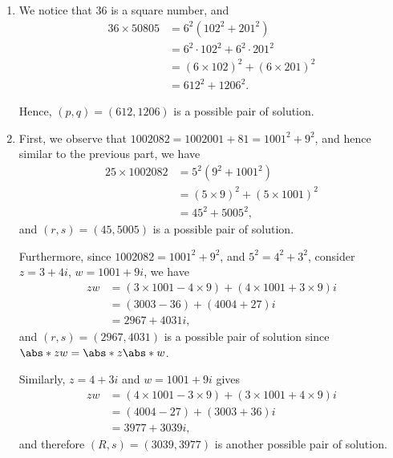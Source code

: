 \begin{enumerate}
    \item We notice that \(36\) is a square number, and
          \begin{align*}
              36 \times 50805 & = 6^2 \left(102^2 + 201^2\right)      \\
                              & = 6^2 \cdot 102^2 + 6^2 \cdot 201^2   \\
                              & = (6 \times 102)^2 + (6 \times 201)^2 \\
                              & = 612^2 + 1206^2.
          \end{align*}

          Hence, \((p, q) = (612, 1206)\) is a possible pair of solution.

    \item First, we observe that \(1002082 = 1002001 + 81 = 1001^2 + 9^2\), and hence similar to the previous part, we have
          \begin{align*}
              25 \times 1002082 & = 5^2 \left(9^2 + 1001^2\right)                            \\
                                & = \left(5 \times 9\right)^2 + \left(5 \times 1001\right)^2 \\
                                & = 45^2 + 5005^2,
          \end{align*}
          and \((r, s) = (45, 5005)\) is a possible pair of solution.

          Furthermore, since \(1002082 = 1001^2 + 9^2\), and \(5^2 = 4^2 + 3^2\), consider \(z = 3 + 4i\), \(w = 1001 + 9i\), we have
          \begin{align*}
              zw & = (3 \times 1001 - 4 \times 9) + (4 \times 1001 + 3 \times 9) i \\
                 & = (3003 - 36) + (4004 + 27) i                                   \\
                 & = 2967 + 4031 i,
          \end{align*}
          and \((r, s) = (2967, 4031)\) is a possible pair of solution since \(\abs*{zw} = \abs*{z} \abs*{w}\).

          Similarly, \(z = 4 + 3i\) and \(w = 1001 + 9i\) gives
          \begin{align*}
              zw & = (4 \times 1001 - 3 \times 9) + (3 \times 1001 + 4 \times 9) i \\
                 & = (4004 - 27) + (3003 + 36) i                                   \\
                 & = 3977 + 3039 i,
          \end{align*}
          and therefore \((R, s) = (3039, 3977)\) is another possible pair of solution.


\end{enumerate}
